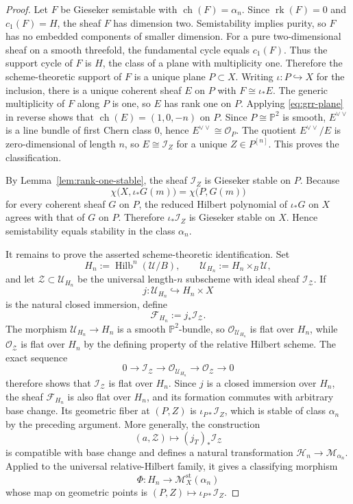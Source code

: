 \documentclass[12pt]{amsart}
\numberwithin{equation}{section}
\newcommand{\PP}{\mathbb{P}}
\newcommand{\OO}{\mathcal{O}}
\newcommand{\I}{\mathcal{I}}
\newcommand{\M}{\mathcal{M}}
\newcommand{\Hilb}{\operatorname{Hilb}}
\newcommand{\ch}{\operatorname{ch}}
\newcommand{\rk}{\operatorname{rk}}
\newcommand{\dual}{\vee}
\theoremstyle{plain}
\theoremstyle{definition}
\theoremstyle{remark}
\begin{document}
\begin{proof}
Let $F$ be Gieseker semistable with $\ch(F)=\alpha_n$.
Since $\rk(F)=0$ and $c_1(F)=H$, the sheaf $F$ has dimension two.
Semistability implies purity, so $F$ has no embedded components of smaller dimension.
For a pure two-dimensional sheaf on a smooth threefold, the fundamental cycle equals $c_1(F)$.
Thus the support cycle of $F$ is $H$, the class of a plane with multiplicity one.
Therefore the scheme-theoretic support of $F$ is a unique plane $P\subset X$.
Writing $\iota\colon P\hookrightarrow X$ for the inclusion, there is a unique coherent sheaf $E$ on $P$ with $F\cong \iota_*E$.
The generic multiplicity of $F$ along $P$ is one, so $E$ has rank one on $P$.
Applying \eqref{eq:grr-plane} in reverse shows that $\ch(E)=(1,0,-n)$ on $P$.
Since $P\cong \PP^2$ is smooth, $E^{\dual\dual}$ is a line bundle of first Chern class $0$, hence $E^{\dual\dual}\cong \OO_P$.
The quotient $E^{\dual\dual}/E$ is zero-dimensional of length $n$, so $E\cong \I_Z$ for a unique $Z\in P^{[n]}$.
This proves the classification.

By Lemma~\ref{lem:rank-one-stable}, the sheaf $\I_Z$ is Gieseker stable on $P$.
Because
\[
\chi\bigl(X,\iota_*G(m)\bigr)=\chi\bigl(P,G(m)\bigr)
\]
for every coherent sheaf $G$ on $P$, the reduced Hilbert polynomial of $\iota_*G$ on $X$ agrees with that of $G$ on $P$.
Therefore $\iota_*\I_Z$ is Gieseker stable on $X$.
Hence semistability equals stability in the class $\alpha_n$.

It remains to prove the asserted scheme-theoretic identification.
Set
\[
H_n:=\Hilb^n(\mathcal U/B),
\qquad
\mathcal U_{H_n}:=H_n\times_B\mathcal U,
\]
and let $\mathcal Z\subset\mathcal U_{H_n}$ be the universal length-$n$ subscheme with ideal sheaf $\mathcal I_{\mathcal Z}$.
If
\[
j\colon \mathcal U_{H_n}\hookrightarrow H_n\times X
\]
is the natural closed immersion, define
\[
\mathcal F_{H_n}:=j_*\mathcal I_{\mathcal Z}.
\]
The morphism $\mathcal U_{H_n}\to H_n$ is a smooth $\PP^2$-bundle, so $\mathcal O_{\mathcal U_{H_n}}$ is flat over $H_n$, while $\mathcal O_{\mathcal Z}$ is flat over $H_n$ by the defining property of the relative Hilbert scheme.
The exact sequence
\[
0\longrightarrow\mathcal I_{\mathcal Z}
\longrightarrow\mathcal O_{\mathcal U_{H_n}}
\longrightarrow\mathcal O_{\mathcal Z}
\longrightarrow 0
\]
therefore shows that $\mathcal I_{\mathcal Z}$ is flat over $H_n$.
Since $j$ is a closed immersion over $H_n$, the sheaf $\mathcal F_{H_n}$ is also flat over $H_n$, and its formation commutes with arbitrary base change.
Its geometric fiber at $(P,Z)$ is $\iota_{P*}\mathcal I_Z$, which is stable of class $\alpha_n$ by the preceding argument.
More generally, the construction
\[
(a,\mathcal Z)\longmapsto (j_T)_*\mathcal I_{\mathcal Z}
\]
is compatible with base change and defines a natural transformation $\mathscr H_n\to\mathscr M_{\alpha_n}$.
Applied to the universal relative-Hilbert family, it gives a classifying morphism
\[
\Phi\colon H_n\longrightarrow \M_X^{\mathrm{st}}(\alpha_n)
\]
whose map on geometric points is $(P,Z)\mapsto\iota_{P*}\mathcal I_Z$.


\end{proof}
\end{document}
